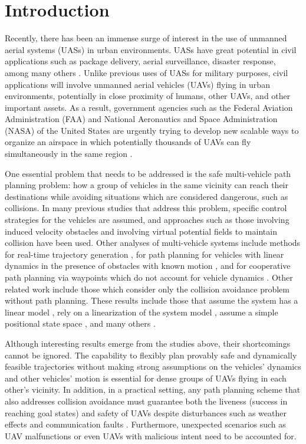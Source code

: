 \section{Introduction}
Recently, there has been an immense surge of interest in the use of unmanned aerial systems (UASs) in urban environments. UASs have great potential in civil applications such as package delivery, aerial surveillance, disaster response, among many others \cite{Tice91, Debusk10, Amazon16, AUVSI16, BBC16}. Unlike previous uses of UASs for military purposes, civil applications will involve unmanned aerial vehicles (UAVs) flying in urban environments, potentially in close proximity of humans, other UAVs, and other important assets. As a result, government agencies such as the Federal Aviation Administration (FAA) and National Aeronautics and Space Administration (NASA) of the United States are urgently trying to develop new scalable ways to organize an airspace in which potentially thousands of UAVs can fly simultaneously in the same region \cite{FAA13, NASA16, Kopardekar16}.

One essential problem that needs to be addressed is the safe multi-vehicle path planning problem: how a group of vehicles in the same vicinity can reach their destinations while avoiding situations which are considered dangerous, such as collisions. In many previous studies that address this problem, specific control strategies for the vehicles are assumed, and approaches such as those involving induced velocity obstacles \cite{Fiorini98, Chasparis05, Vandenberg08,Wu2012} and involving virtual potential fields to maintain collision \cite{Olfati-Saber2002, Chuang07} have been used. Other analyses of multi-vehicle systems include methods for real-time trajectory generation \cite{Feng-LiLian2002}, for path planning for vehicles with linear dynamics in the presence of obstacles with known motion \cite{Ahmadzadeh2009}, and for cooperative path planning via waypoints which do not account for vehicle dynamics \cite{Bellingham}. Other related work include those which consider only the collision avoidance problem without path planning. These results include those that assume the system has a linear model \cite{Beard2003, Schouwenaars2004, Stipanovic2007}, rely on a linearization of the system model \cite{Massink2001, Althoff2011}, assume a simple positional state space \cite{Lin2015}, and many others \cite{Lalish2008, Hoffmann2008, Chen2016}.

Although interesting results emerge from the studies above, their shortcomings cannot be ignored. The capability to flexibly plan provably safe and dynamically feasible trajectories without making strong assumptions on the vehicles' dynamics and other vehicles' motion is essential for dense groups of UAVs flying in each other's vicinity. In addition, in a practical setting, any path planning scheme that also addresses collision avoidance must guarantee both the liveness (success in reaching goal states) and safety of UAVs despite disturbances such as weather effects and communication faults \cite{Kopardekar16}. Furthermore, unexpected scenarios such as UAV malfunctions or even UAVs with malicious intent need to be accounted for.

